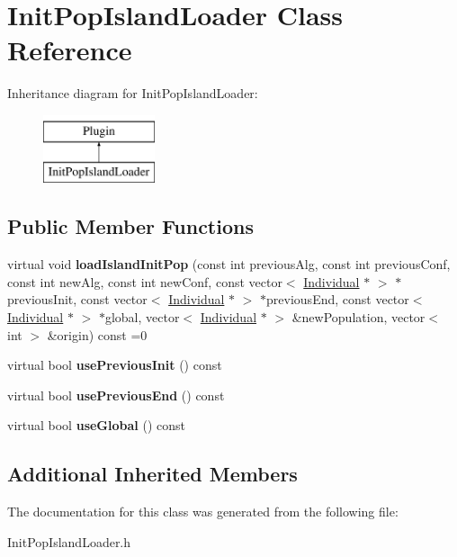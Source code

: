 \hypertarget{classInitPopIslandLoader}{}\section{Init\+Pop\+Island\+Loader Class Reference}
\label{classInitPopIslandLoader}
Inheritance diagram for Init\+Pop\+Island\+Loader\+:\begin{figure}[H]
\begin{center}
\leavevmode
\includegraphics[height=2.000000cm]{d5/da6/classInitPopIslandLoader}
\end{center}
\end{figure}
\subsection*{Public Member Functions}
\begin{DoxyCompactItemize}
\item 
\mbox{\label{classInitPopIslandLoader_ad8935d4f5f2eadf3a5a212874f12f784}} 
virtual void {\bfseries load\+Island\+Init\+Pop} (const int previous\+Alg, const int previous\+Conf, const int new\+Alg, const int new\+Conf, const vector$<$ \mbox{\hyperlink{classIndividual}{Individual}} $\ast$ $>$ $\ast$previous\+Init, const vector$<$ \mbox{\hyperlink{classIndividual}{Individual}} $\ast$ $>$ $\ast$previous\+End, const vector$<$ \mbox{\hyperlink{classIndividual}{Individual}} $\ast$ $>$ $\ast$global, vector$<$ \mbox{\hyperlink{classIndividual}{Individual}} $\ast$ $>$ \&new\+Population, vector$<$ int $>$ \&origin) const =0
\item 
\mbox{\label{classInitPopIslandLoader_a73b8d540a41a99c7ae0c5de1a7bf23bf}} 
virtual bool {\bfseries use\+Previous\+Init} () const
\item 
\mbox{\label{classInitPopIslandLoader_a1025015ccb1d952bbcd421f3eb126814}} 
virtual bool {\bfseries use\+Previous\+End} () const
\item 
\mbox{\label{classInitPopIslandLoader_ad06e23f020118b4a627720b83a1a4323}} 
virtual bool {\bfseries use\+Global} () const
\end{DoxyCompactItemize}
\subsection*{Additional Inherited Members}


The documentation for this class was generated from the following file\+:\begin{DoxyCompactItemize}
\item 
Init\+Pop\+Island\+Loader.\+h\end{DoxyCompactItemize}
